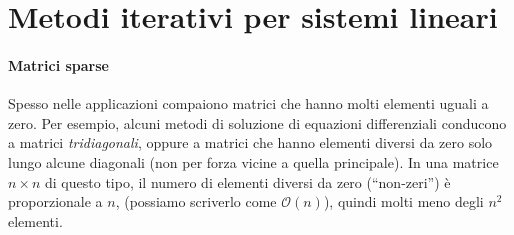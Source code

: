 \documentclass[a4paper]{report}
\theoremstyle{definiton}
\theoremstyle{remark}
\begin{document}




\section{Metodi iterativi per sistemi lineari}

\paragraph{Matrici sparse} Spesso nelle applicazioni compaiono matrici che hanno molti elementi uguali a zero. Per esempio, alcuni metodi di soluzione di equazioni differenziali conducono a matrici \emph{tridiagonali}, oppure a matrici che hanno elementi diversi da zero solo lungo alcune diagonali (non per forza vicine a quella principale). In una matrice $n\times n$ di questo tipo, il numero di elementi diversi da zero (``non-zeri'') è proporzionale a $n$, (possiamo scriverlo come $\mathcal{O}(n)$), quindi molti meno degli $n^2$ elementi.
\end{document}

